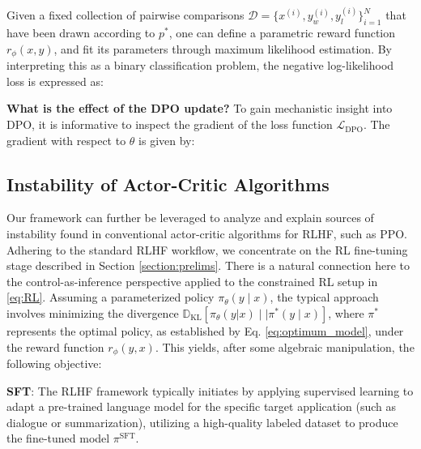 Given a fixed collection of pairwise comparisons $\mathcal{D}=\bigl\{x^{(i)}, y_w^{(i)}, y_l^{(i)}\bigr\}_{i=1}^N$ that have been drawn according to $p^*$, one can define a parametric reward function $r_{\phi}(x, y)$, and fit its parameters through maximum likelihood estimation. By interpreting this as a binary classification problem, the negative log-likelihood loss is expressed as:

\textbf{What is the effect of the DPO update?} To gain mechanistic insight into DPO, it is informative to inspect the gradient of the loss function $\mathcal{L}_\text{DPO}$. The gradient with respect to $\theta$ is given by:

\subsection{Instability of Actor-Critic Algorithms} Our framework can further be leveraged to analyze and explain sources of instability found in conventional actor-critic algorithms for RLHF, such as PPO. Adhering to the standard RLHF workflow, we concentrate on the RL fine-tuning stage described in Section \ref{section:prelims}. There is a natural connection here to the control-as-inference perspective \cite{levine2018reinforcement} applied to the constrained RL setup in \ref{eq:RL}. Assuming a parameterized policy $\pi_{\theta}(y\mid x)$, the typical approach involves minimizing the divergence $\mathbb{D}_{\text{KL}}[\pi_{\theta}(y|x) \mid \mid \pi^*(y\mid x)]$, where $\pi^*$ represents the optimal policy, as established by Eq. \ref{eq:optimum_model}, under the reward function $r_{\phi}(y, x)$. This yields, after some algebraic manipulation, the following objective:

\textbf{SFT}: The RLHF framework typically initiates by applying supervised learning to adapt a pre-trained language model for the specific target application (such as dialogue or summarization), utilizing a high-quality labeled dataset to produce the fine-tuned model $\pi^\text{SFT}$.